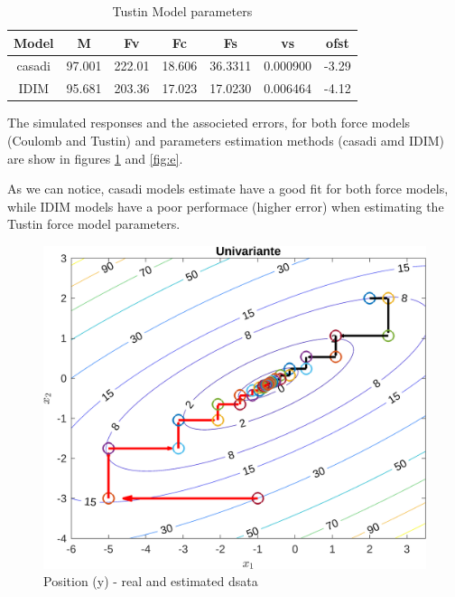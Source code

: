 \documentclass[10pt, a4paper]{article}
\begin{document}
\begin{table}[H]
      \small
      \centering
      \caption{Tustin Model parameters}
      \begin{tabular}{c|c|c|c|c|c|c}
            Model &  M & Fv & Fc & Fs & vs & ofst \\
            \hline
            casadi & 97.001 & 222.01 & 18.606 & 36.3311 & 0.000900 & -3.29 \\
            IDIM   & 95.681 & 203.36 & 17.023 & 17.0230 & 0.006464 & -4.12 \\
      \end{tabular}
      \label{table:m2}
\end{table}

The simulated responses and the associeted errors, for both force models (Coulomb and Tustin) and parameters estimation methods (casadi amd IDIM) are show in figures \ref{fig:y} and \ref{fig:e}.

As we can notice, casadi models estimate have a good fit for both force models, while IDIM models have a poor performace (higher error) when estimating the Tustin force model parameters.

\begin{figure}[H]
      \centering
      \includegraphics[width=\textwidth]{img01A_m01.png}
      \caption{Position (y) - real and estimated dsata}
      \label{fig:y}
\end{figure}
\end{document}
